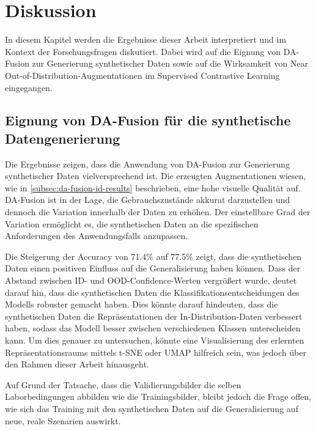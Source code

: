 \chapter{Diskussion} \label{ch:discussion} %

In diesem Kapitel werden die Ergebnisse dieser Arbeit interpretiert und im Kontext der Forschungsfragen diskutiert. Dabei wird auf die Eignung von DA-Fusion zur Generierung synthetischer Daten sowie auf die Wirksamkeit von Near Out-of-Distribution-Augmentationen im Supervised Contrastive Learning eingegangen.

\section{Eignung von DA-Fusion für die synthetische Datengenerierung} \label{sec:da-fusion-discussion}

Die Ergebnisse zeigen, dass die Anwendung von DA-Fusion zur Generierung synthetischer Daten vielversprechend ist. Die erzeugten Augmentationen wiesen, wie in \autoref{subsec:da-fusion-id-results} beschrieben, eine hohe visuelle Qualität auf. DA-Fusion ist in der Lage, die Gebrauchszustände akkurat darzustellen und dennoch die Variation innerhalb der Daten zu erhöhen. Der einstellbare Grad der Variation ermöglicht es, die synthetischen Daten an die spezifischen Anforderungen des Anwendungsfalls anzupassen.

Die Steigerung der Accuracy von 71.4\% auf 77.5\% zeigt, dass die synthetischen Daten einen positiven Einfluss auf die Generalisierung haben können. Dass der Abstand zwischen ID- und OOD-Confidence-Werten vergrößert wurde, deutet darauf hin, dass die synthetischen Daten die Klassifikationsentscheidungen des Modells robuster gemacht haben. Dies könnte darauf hindeuten, dass die synthetischen Daten die Repräsentationen der In-Distribution-Daten verbessert haben, sodass das Modell besser zwischen verschiedenen Klassen unterscheiden kann. Um dies genauer zu untersuchen, könnte eine Visualisierung des erlernten Repräsentationsraums mittels t-SNE \parencite{Vandermaaten2008tsne} oder UMAP \parencite{Mcinnes2020umap} hilfreich sein, was jedoch über den Rahmen dieser Arbeit hinausgeht.

Auf Grund der Tatsache, dass die Validierungsbilder die selben Laborbedingungen abbilden wie die Trainingsbilder, bleibt jedoch die Frage offen, wie sich das Training mit den synthetischen Daten auf die Generalisierung auf neue, reale Szenarien auswirkt.

